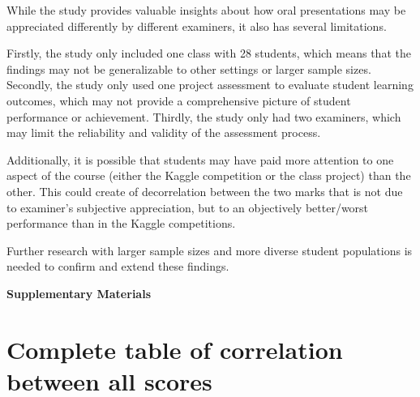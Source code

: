 \documentclass[a4paper]{article}
\begin{document}
	While the study provides valuable insights about how oral presentations may be appreciated differently by different examiners, it also has several limitations.
	
	Firstly, the study only included one class with 28 students, which means that the findings may not be generalizable to other settings or larger sample sizes.
	Secondly, the study only used one project assessment to evaluate student learning outcomes, which may not provide a comprehensive picture of student performance or achievement.
	Thirdly, the study only had two examiners, which may limit the reliability and validity of the assessment process.
	
	Additionally, it is possible that students may have paid more attention to one aspect of the course (either the Kaggle competition or the class project) than the other.
	This could create of decorrelation between the two marks that is not due to examiner's subjective appreciation, but to an objectively better/worst performance than in the Kaggle competitions.
	
	Further research with larger sample sizes and more diverse student populations is needed to confirm and extend these findings.

	
	
	
	
	\begin{center}
		\textbf{\LARGE Supplementary Materials}
	\end{center}
	
	\section*{Complete table of correlation between all scores}
\end{document}
